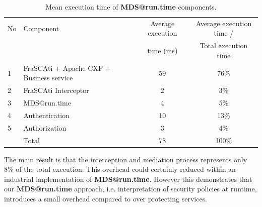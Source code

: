\documentclass[runningheads,a4paper]{llncs}
\begin{document}
\begin{table}

\caption{Mean execution time of \textbf{MDS@run.time} components.}
\begin{tabular}{|p{0.4cm}|p{3.8cm}|c|c|}
\hline
No & Component &   Average execution  &  Average execution time / \\
 &  &   time (ms) &  Total execution time \\
  \hline
 1 & FraSCAti + Apache CXF + Business service & 59 &  76\%\\
2 & FraSCAti Interceptor & 2 &  3\%\\ 
3 & MDS@run.time & 4 &  5\%\\
 4 & Authentication& 10 & 13\%\\
5 & Authorization & 3 & 4\%\\
 \hline
 &  Total & 78 & 100\%\\
    \hline

\end{tabular}
\end{table}

The main result is that the interception and mediation process represents only 8\% of the total execution.
This overhead could certainly reduced within an industrial implementation of \textbf{MDS@run.time}.
However this demonstrates that our \textbf{MDS@run.time} approach, i.e. interpretation of security policies at runtime, introduces a small overhead compared to over protecting services.
\end{document}

